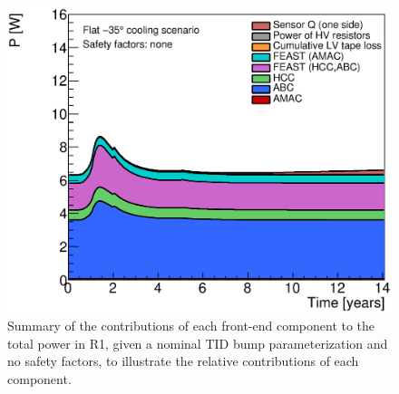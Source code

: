 \begin{figure}[ht!]
\begin{center}
\includegraphics[width=0.59\linewidth]{figures/PowerStackPlot.eps}
\end{center}
\caption{Summary of the contributions of each front-end component to the total power in R1, given
a nominal TID bump parameterization and no safety factors, to illustrate the relative contributions
of each component.}
\label{power_stackplot}
\end{figure}

